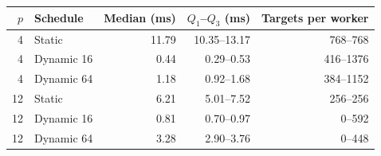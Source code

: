 \begin{tabular}{@{}rlrrr@{}}\toprule
$p$ & Schedule & Median (ms) & $Q_1$--$Q_3$ (ms) & Targets per worker \\\midrule
4 & Static & 11.79 & 10.35--13.17 & 768--768 \\
4 & Dynamic 16 & 0.44 & 0.29--0.53 & 416--1376 \\
4 & Dynamic 64 & 1.18 & 0.92--1.68 & 384--1152 \\
12 & Static & 6.21 & 5.01--7.52 & 256--256 \\
12 & Dynamic 16 & 0.81 & 0.70--0.97 & 0--592 \\
12 & Dynamic 64 & 3.28 & 2.90--3.76 & 0--448 \\
\bottomrule\end{tabular}
